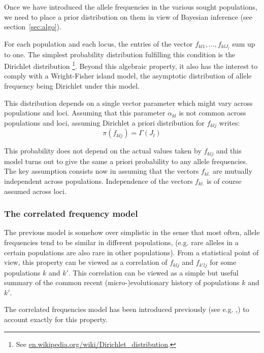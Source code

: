 \documentclass[a4paper,10pt]{article}
\begin{document}
Once we have introduced the allele frequencies in the various sought populations, we need to place a prior distribution on them 
in view of Bayesian inference (see section~\ref{sec:algo}).

For each population and each locus, the entries of the vector $f_{kl1},...,f_{klJ_l}$ sum up to one. 
The simplest probability distribution fulfilling this condition is the Dirichlet distribution 
\footnote{See \url{ en.wikipedia.org/wiki/Dirichlet\_distribution}.}.
Beyond this algebraic property, 
it also has the interest to comply with a Wright-Fisher island model, the asymptotic distribution of allele frequency being 
Dirichlet under this model. 

This distribution depends on a single vector parameter which might vary across populations and loci. 
Assuming that this parameter $\alpha_{kl}$ is not common across 
populations and loci, assuming Dirichlet a priori distribution for $f_{klj}$ writes:
 \begin{equation}\label{eq:UFM}
\pi(f_{klj}) = \Gamma(J_l)
\end{equation}

This probability does not depend on the actual values taken by $f_{klj}$ and this model turns out to give the same 
a priori probability to any allele frequencies. 
The key assumption consists now in assuming that the vectors $f_{kl.}$ are mutually independent across populations. 
Independence  of the vectors $f_{kl.}$ is of course assumed across loci.




\subsubsection{The correlated frequency model}

The previous model is somehow over simplistic in the sense that most often, allele frequencies tend to be 
similar in different populations, 
(e.g. rare alleles  in a certain populations are also rare in other 
populations). From a statistical point of view, this property can be viewed as a correlation of $f_{klj}$ and $f_{k'lj}$ 
for some populations $k$ and $k'$.
This correlation can be viewed as a simple but useful summary of the common recent (micro-)evolutionary history of populations $k$ and $k'$.


The correlated frequencies model has been introduced previously 
(see e.g. \citep{Balding03},\citep{Nicholson02})  to account exactly for this property.
\end{document}
